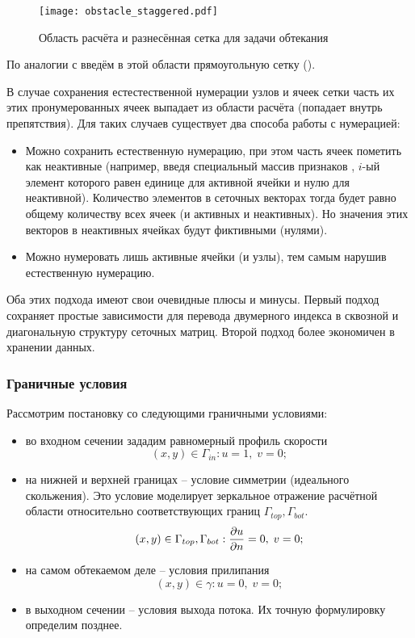 \begin{figure}[h!]
\centering
\texttt{[image: obstacle\_staggered.pdf]}
\caption{Область расчёта и разнесённая сетка для задачи обтекания}
\label{fig:obstacle_staggered}
\end{figure}

По аналогии с  введём в этой области
прямоугольную сетку ().

В случае сохранения естестественной нумерации узлов и ячеек сетки
часть их этих пронумерованных ячеек выпадает из области расчёта (попадает внутрь препятствия).
Для таких случаев существует два способа работы с нумерацией:
\begin{itemize}
\item
Можно сохранить естественную нумерацию, при этом часть ячеек пометить
как неактивные (например, введя специальный массив признаков ,
$i$-ый элемент которого равен единице для активной ячейки и нулю для неактивной).
Количество элементов в сеточных векторах тогда будет равно общему количеству
всех ячеек (и активных и неактивных). Но значения этих векторов в неактивных ячейках будут фиктивными (нулями).
\item
Можно нумеровать лишь активные ячейки (и узлы), тем самым
нарушив естественную нумерацию. 
\end{itemize}

Оба этих подхода имеют свои очевидные плюсы и минусы.
Первый подход сохраняет простые зависимости для перевода двумерного индекса в сквозной и
диагональную структуру сеточных матриц. Второй подход более экономичен в хранении данных. 

\subsubsection{Граничные условия}
Рассмотрим постановку со следующими граничными условиями:
\begin{itemize}
\item
во входном сечении зададим равномерный профиль скорости
\begin{equation}
\label{eq:ns2d_obstable_bc_in}
(x, y) \in \Gamma_{in}: u=1, \; v=0;
\end{equation}
\item
на нижней и верхней границах -- условие симметрии (идеального скольжения). Это условие моделирует
зеркальное отражение расчётной области относительно соответствующих границ $\Gamma_{top}, \Gamma_{bot}$.
\begin{equation}
\label{eq:ns2d_obstable_bc_topbot}
(x, y) \in \Gamma_{top}, \Gamma_{bot}: \frac{\partial u}{\partial n}=0, \; v = 0;
\end{equation}
\item
на самом обтекаемом деле -- условия прилипания
\begin{equation}
\label{eq:ns2d_obstable_bc_wall}
(x,y) \in \gamma: u=0, \; v=0;
\end{equation}
\item
в выходном сечении -- условия выхода потока. Их точную формулировку определим позднее.
\end{itemize}

